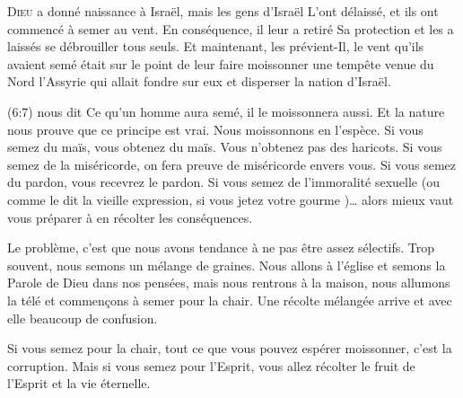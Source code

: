 \dvrule






\lettrine{D}{ieu} a donné naissance à Israël, mais les gens d'Israël
 L'ont délaissé, et ils ont commencé à semer au vent.
 En conséquence, il leur a retiré Sa protection et les a laissés 
 se débrouiller tous seuls. Et maintenant, les prévient-Il,
 le vent qu'ils avaient semé était sur le point de leur faire moissonner
 une tempête venue du Nord
 \ocadr l'Assyrie qui allait fondre sur eux et disperser la nation d'Israël. 


(6:7) nous dit\frcolon{} 
 \Og Ce qu'un homme aura semé, il le moissonnera aussi. \Fg{}
 Et la nature nous prouve que ce principe est vrai.
 Nous moissonnons en l'espèce. Si vous semez du maïs, vous obtenez du maïs.
 Vous n'obtenez pas des haricots. Si vous semez de la miséricorde,
 on fera preuve de miséricorde envers vous. Si vous semez du pardon,
 vous recevrez le pardon. Si vous semez de l'immoralité sexuelle
 (ou comme le dit la vieille expression,
 \Og si vous jetez votre gourme \Fg{})\dots{}
 alors mieux vaut vous préparer à en récolter les conséquences. 

Le problème, c'est que nous avons tendance à ne pas être assez sélectifs.
 Trop souvent, nous semons un mélange de graines.
 Nous allons à l'église et semons la Parole de Dieu dans nos pensées,
 mais nous rentrons à la maison, nous allumons la télé et commen\c{c}ons à semer
 pour la chair. Une récolte mélangée arrive et avec elle beaucoup de confusion. 

Si vous semez pour la chair, tout ce que vous pouvez espérer moissonner,
 c'est la corruption. Mais si vous semez pour l'Esprit,
 vous allez récolter le fruit de l'Esprit et la vie éternelle. 

\dvrule



